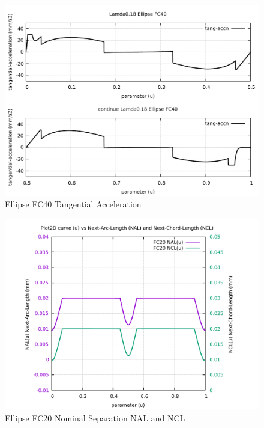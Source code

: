 \begin{figure}
	\caption     {Ellipse FC40 Tangential Acceleration}
	\label{24-img-Ellipse-FC40-Tangential-Acceleration.pdf}
	\includegraphics[width=1.00\textwidth]{Chap4/appendix/app-Ellipse/plots/24-img-Ellipse-FC40-Tangential-Acceleration.pdf}
\end{figure}

\clearpage
\pagebreak

\begin{figure}
	\caption     {Ellipse FC20 Nominal Separation NAL and NCL}
	\label{25-img-Ellipse-FC20-Nominal-Separation-NAL-and-NCL.pdf}
	\includegraphics[width=1.00\textwidth]{Chap4/appendix/app-Ellipse/plots/25-img-Ellipse-FC20-Nominal-Separation-NAL-and-NCL.pdf}
\end{figure}



